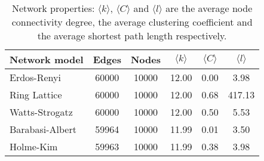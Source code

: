 \begin{table}[h]
\centering
\caption{Network properties: $\langle k \rangle$, $\langle C \rangle$ and $\langle l \rangle$ are the average node connectivity degree, the average clustering coefficient and the average shortest path length respectively. }
\label{tab:networks}
\begin{tabular}{lccccc}
\toprule
         Network model &  Edges &  Nodes & $\langle k \rangle$ & $\langle C \rangle$ & $\langle l \rangle$ \\ 
\midrule
     Erdos-Renyi &  60000 &  10000 & 12.00 &  0.00 &    3.98 \\
    Ring Lattice &  60000 &  10000 & 12.00 &  0.68 &  417.13 \\
  Watts-Strogatz &  60000 &  10000 & 12.00 &  0.50 &    5.53 \\
 Barabasi-Albert &  59964 &  10000 & 11.99 &  0.01 &    3.50 \\
       Holme-Kim &  59963 &  10000 & 11.99 &  0.38 &    3.98 \\
\bottomrule
\end{tabular}
\end{table}
